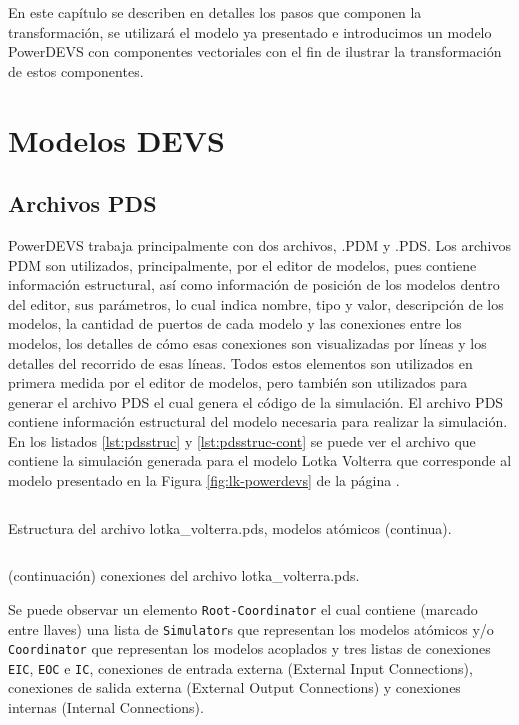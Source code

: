 	En este capítulo se describen en detalles los pasos que componen la transformación, se utilizará el modelo ya presentado e introducimos un modelo 
	PowerDEVS con componentes vectoriales con el fin de ilustrar la transformación de estos componentes.

\section{Modelos DEVS}

        \subsection{Archivos PDS}
        PowerDEVS trabaja principalmente con dos archivos, .PDM y .PDS.
        Los archivos PDM son utilizados, principalmente, por el editor de modelos, pues contiene información estructural, así como información de posición de los modelos dentro del 
        editor, sus parámetros, lo cual indica nombre, tipo y valor, descripción de los modelos, la cantidad de puertos de cada modelo y las conexiones
        entre los modelos, los detalles de cómo esas conexiones son visualizadas por líneas y los detalles del recorrido de esas líneas. 
        Todos estos elementos son utilizados en primera medida por el editor de modelos, pero también son utilizados para generar el archivo PDS el cual genera el 
	código de la simulación.
        El archivo PDS contiene información estructural del modelo necesaria para realizar la simulación. En los listados \ref{lst:pdsstruc} y \ref{lst:pdsstruc-cont}
	 se puede ver el archivo que contiene la simulación generada para el modelo Lotka Volterra que corresponde al modelo presentado en la 
	Figura \ref{fig:lk-powerdevs} de la página \pageref{fig:lk-powerdevs}.

\begin{listing}[H]
        \inputminted[linenos,breaklines=true,lastline=32]{modelica}{src/lotka_volterra.pds}
\caption{Estructura del archivo lotka\_volterra.pds, modelos atómicos (continua).}\label{lst:pdsstruc}
\end{listing}


\begin{listing}[H]
        \inputminted[firstline=33,linenos,breaklines=true]{modelica}{src/lotka_volterra.pds}
\caption{(continuación) conexiones del archivo lotka\_volterra.pds.}\label{lst:pdsstruc-cont}
\end{listing}

        Se puede observar un elemento \texttt{Root-Coordinator} el cual contiene (marcado entre llaves) una lista de \texttt{Simulator}s que representan 
        los modelos atómicos y/o \texttt{Coordinator} que representan los modelos acoplados y tres listas de 
        conexiones \texttt{EIC}, \texttt{EOC} e \texttt{IC}, conexiones de entrada externa (External Input Connections), 
        conexiones de salida externa (External Output Connections) y conexiones internas (Internal Connections).


